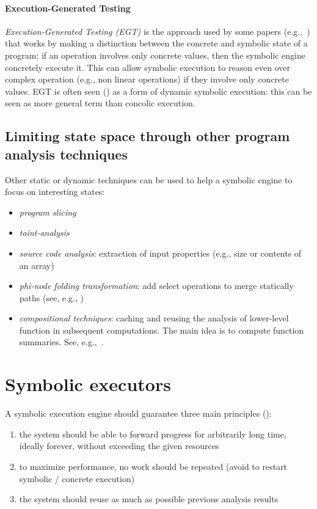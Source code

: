 \paragraph{Execution-Generated Testing} {\em Execution-Generated Testing (EGT)} is the approach used by some papers (e.g.,~\cite{KLEE-OSDI08,EXE-CCS06}) that works by making a distinction between the concrete and symbolic state of a program: if an operation involves only concrete values, then the symbolic engine concretely execute it. This can allow symbolic execution to reason even over complex operation (e.g., non linear operations) if they involve only concrete values. EGT is often seen (\cite{CS-CACM13}) as a form of dynamic symbolic execution: this can be seen as more general term than concolic execution.

\subsection{Limiting state space through other program analysis techniques}

Other static or dynamic techniques can be used to help a symbolic engine to focus on interesting states:
\begin{itemize}
  \item {\em program slicing}
  \item {\em taint-analysis}
  \item {\em source code analysis}: extraction of input properties (e.g., size or contents of an array)
  \item {\em phi-node folding transformation}: add select operations to merge statically paths (see, e.g., \cite{CCK-EUROSYS11})
  \item {\em compositional techniques}: caching and reusing the analysis of lower-level function in subsequent computations. The main idea is to compute function summaries. See, e.g.,~\cite{G-POPL07,G-PLDI11,MS-TR07}.
\end{itemize}

\section{Symbolic executors}
A symbolic execution engine should guarantee three main principles (\cite{MAYHEM-SP12}):
\begin{enumerate}
  \item the system should be able to forward progress for arbitrarily long time, ideally forever, without exceeding the given resources
  \item to maximize performance, no work should be repeated (avoid to restart symbolic / concrete execution)
  \item the system should reuse as much as possible previous analysis results
\end{enumerate}

